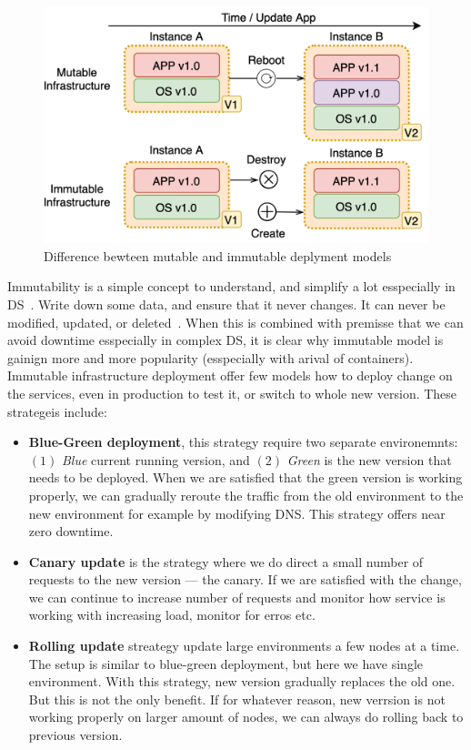 \begin{figure}[H]
	\begin{center}
		\includegraphics[scale=0.7]{images/Figure12.png}
	\end{center}
	\vspace{-0.6cm}
	\caption{Difference bewteen mutable and immutable deplyment models}
	\label{fig:fig12}
\end{figure}

Immutability is a simple concept to understand, and simplify a lot esspecially in DS~\cite{Helland16}. Write down some data, and ensure that it never changes. It can never be modified, updated, or deleted~\cite{perry2020art}. When this is combined with premisse that we can avoid downtime esspecially in complex DS, it is clear why immutable model is gainign more and more popularity (esspecially with arival of containers). Immutable infrastructure deployment offer few models how to deploy change on the services, even in production to test it, or switch to whole new version. These strategeis include:

\begin{itemize}
	\item \textbf{Blue-Green deployment}, this strategy require two separate environemnts: $(1)$ \textit{Blue} current running version, and $(2)$ \textit{Green} is the new version that needs to be deployed. When we are satisfied that the green version is working properly, we can gradually reroute the traffic from the old environment to the new environment for example by modifying DNS. This strategy offers near zero downtime.
	\item \textbf{Canary update} is the strategy where we do direct a small number of requests to the new version --- the canary. If we are satisfied with the change, we can continue to increase number of requests and monitor how service is working with increasing load, monitor for erros etc.
	\item \textbf{Rolling update} streategy update large environments a few nodes at a time. The setup is similar to blue-green deployment, but here we have single environment. With this strategy, new version gradually replaces the old one. But this is not the only benefit. If for whatever reason, new verrsion is not working properly on larger amount of nodes, we can always do rolling back to previous version.
\end{itemize}

